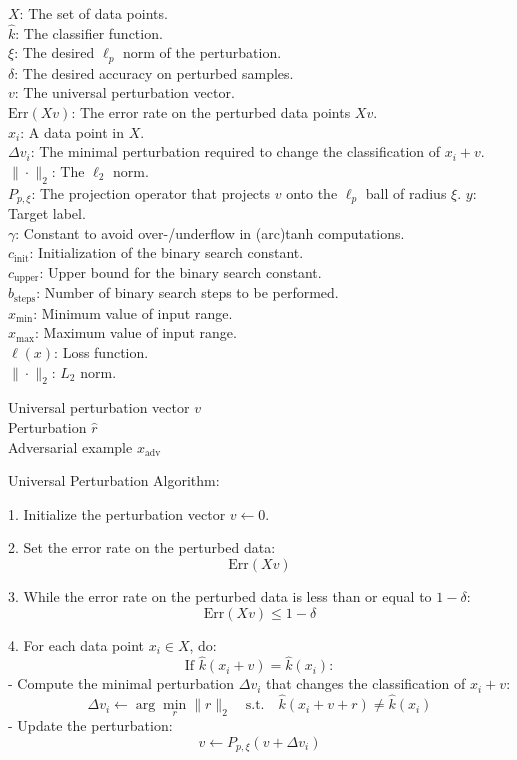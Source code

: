 
$X$: The set of data points.\\
$\hat{k}$: The classifier function.\\
$\xi$: The desired $\ell_p$ norm of the perturbation.\\
$\delta$: The desired accuracy on perturbed samples.\\
$v$: The universal perturbation vector.\\
$\text{Err}(Xv)$: The error rate on the perturbed data points $Xv$.\\
$x_i$: A data point in $X$.\\
$\Delta v_i$: The minimal perturbation required to change the classification of $x_i + v$.\\
$\| \cdot \|_2$: The $\ell_2$ norm.\\
$P_{p, \xi}$: The projection operator that projects $v$ onto the $\ell_p$ ball of radius $\xi$.
$y$: Target label.\\
$\gamma$: Constant to avoid over-/underflow in (arc)tanh computations.\\
$c_{\text{init}}$: Initialization of the binary search constant.\\
$c_{\text{upper}}$: Upper bound for the binary search constant.\\
$b_{\text{steps}}$: Number of binary search steps to be performed.\\
$x_{\text{min}}$: Minimum value of input range.\\
$x_{\text{max}}$: Maximum value of input range.\\
$\ell(x)$: Loss function.\\
$\| \cdot \|_2$: $L_2$ norm.

Universal perturbation vector $v$\\
Perturbation $\hat{r}$\\
Adversarial example $x_{\text{adv}}$

Universal Perturbation Algorithm:

1. Initialize the perturbation vector $v \leftarrow 0$.

2. Set the error rate on the perturbed data:
\[
\text{Err}(Xv)
\]

3. While the error rate on the perturbed data is less than or equal to $1 - \delta$:
\[
\text{Err}(Xv) \leq 1 - \delta
\]

4. For each data point $x_i \in X$, do:
\[
\text{If } \hat{k}(x_i + v) = \hat{k}(x_i):
\]
    - Compute the minimal perturbation $\Delta v_i$ that changes the classification of $x_i + v$:
    \[
    \Delta v_i \leftarrow \arg \min_{r} \|r\|_2 \quad \text{s.t.} \quad \hat{k}(x_i + v + r) \neq \hat{k}(x_i)
    \]
    - Update the perturbation:
    \[
    v \leftarrow P_{p, \xi}(v + \Delta v_i)
    \]

